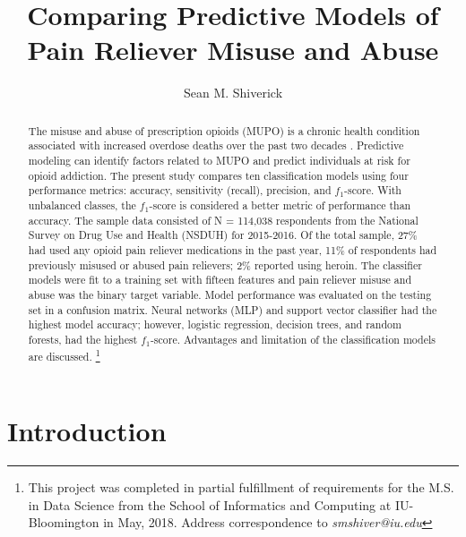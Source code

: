 \documentclass[sigconf]{acmart}
\begin{document}
  \title{Comparing Predictive Models of Pain Reliever Misuse and Abuse}
  \author{Sean M. Shiverick}
\renewcommand{\shortauthors}{S.M. Shiverick}


\begin{abstract}

The misuse and abuse of prescription opioids (MUPO) is a chronic health 
condition associated with increased overdose deaths over the past two decades
\cite{nida18}. Predictive modeling can identify factors related to MUPO and  
predict individuals at risk for opioid addiction. The present study compares 
ten classification models using four performance metrics: accuracy, sensitivity 
(recall), precision, and $f_1$-score. With unbalanced classes, the $f_1$-score 
is considered a better metric of performance than accuracy. The sample data 
consisted of N = 114,038 respondents from the National Survey on Drug Use 
and Health (NSDUH) for 2015-2016. Of the total sample, 27\% had used any 
opioid pain reliever medications in the past year, 11\% of respondents had 
previously misused or abused pain relievers; 2\% reported using heroin. The 
classifier models were fit to a training set with fifteen features and pain 
reliever misuse and abuse was the binary target variable. Model performance 
was evaluated on the testing set in a confusion matrix. Neural networks (MLP) 
and support vector classifier had the highest model accuracy; however, logistic 
regression, decision trees, and random forests, had the highest $f_1$-score. 
Advantages and limitation of the classification models are discussed. 
\footnote{This project was completed in partial fulfillment of requirements 
for the M.S. in Data Science from the School of Informatics and Computing at 
IU-Bloomington in May, 2018. Address correspondence to \textit{smshiver@iu.edu}}

\end{abstract}
\maketitle

\section{Introduction}
\end{document}
